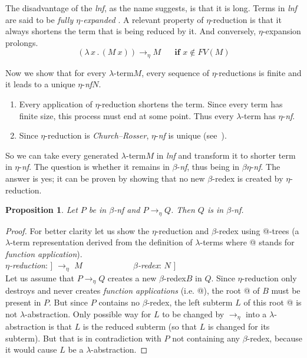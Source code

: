 \documentclass{sig-alternate}
\makeatletter
\newtheorem{proposition}{Proposition}
\newcommand{\Lets}{Let us\xspace}
\newcommand{\lets}{let us\xspace}
\newcommand{\lterm}{$\lambda$-term\xspace}
\newcommand{\lterms}{$\lambda$-terms\xspace}
\newcommand{\atTree}{@-tree\xspace}
\newcommand{\lh}[1]{\lambda #1}
\newcommand{\lamb}[2]{( \lambda \, #1 \, . \, #2 )}
\newcommand{\ered}{$\eta$-reduction\xspace}
\newcommand{\bnf}{$\beta$-\textit{nf}\xspace}
\newcommand{\enf}{$\eta$-\textit{nf}\xspace}
\newcommand{\benf}{$\beta\eta$-\textit{nf}\xspace}
\newcommand{\bredex}{$\beta$-redex\xspace}
\newcommand{\lnf}{\textit{lnf}\xspace}
\newcommand{\eArrow}{\rightarrow_\eta\xspace}
\makeatother
\begin{document}
The disadvantage of the \lnf, as the name suggests, is that it is long.
Terms in \lnf are said to be \textit{fully $\eta$-expanded} \cite{barendregt10}. 
A relevant property of $\eta$-reduction is that it always shortens the term
that is being reduced by it. And conversely, $\eta$-expansion prolongs.
$$\lamb{x}{(M~x)} \eArrow M \textbf{ ~~~~if } x \not\in FV(M) $$

Now we show that for every \lterm $M$, 
every sequence of $\eta$-reductions is finite and
it leads to a unique \enf $N$.

\begin{enumerate}
 \item Every application of \ered shortens the term.
       Since every term has finite size, this process must 
       end at some point. Thus every \lterm has \enf.
 \item Since \ered is \textit{Church–Rosser}, \enf is unique (see~\cite{barendregt84}). 
\end{enumerate}

So we can take every generated \lterm $M$ in 
\lnf and transform it to shorter term in \enf. 
The question is whether it remains in \bnf, thus being in \benf.
The answer is yes; it can be proven by showing that no 
new \bredex is created by \ered.  

\begin{proposition}
Let $P$ be in \bnf and $P \eArrow Q$. Then $Q$ is in \bnf.    
\end{proposition}
\begin{proof}

For better clarity \lets show the \ered and \bredex using \atTree{}s 
(a \lterm representation derived from the definition of \lterms 
where @ stands for \textit{function application}).\\
\textit{\ered}: \Tree [.$\lh{x}$ [.@ $M$ $x$ ] ] 
$\eArrow$
$M$ 
~~~~~~~~~~~
\textit{\bredex}: \Tree [.@ [.$\lh{x}$ $M$ ] $N$ ] \\

\Lets assume that $P \eArrow Q$ creates a new \bredex $B$ in $Q$.
Since \ered only destroys and never creates \textit{function applications} (i.e. @),
the root @ of $B$ must be present in $P$.  
But since $P$ contains no \bredex, the left subterm $L$ of this root @
is not $\lambda$-abstraction.
Only possible way for $L$ to be changed by $\eArrow$ into 
a $\lambda$-abstraction is that $L$ is the reduced subterm (so that
$L$ is changed for its subterm).
But that is in contradiction with $P$ not containing any \bredex,
because it would cause $L$ be a $\lambda$-abstraction.
\end{proof}
\end{document}
